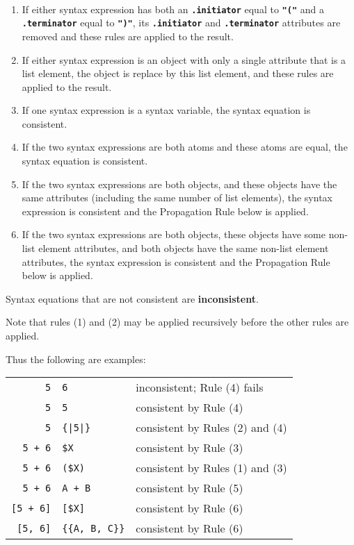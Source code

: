 \documentclass[12pt]{article}
\newcommand{\TT}[1]{{\tt \bfseries #1}}
\newcommand{\key}[1]{{\rm \bfseries #1}}
\newenvironment{indpar}[1][0.3in]%
	{\begin{list}{}%
		     {\setlength{\itemsep}{0in}%
		      \setlength{\topsep}{0in}%
		      \setlength{\parsep}{1ex}%
		      \setlength{\labelwidth}{#1}%
		      \setlength{\leftmargin}{#1}%
		      \addtolength{\leftmargin}{\labelsep}}%
	 \item}%
	{\end{list}}
\begin{document}
\begin{indpar}
\begin{list}{}{}
\item[\key{Syntax Equation Consistency Rules}%
	   \label{SYNTAX-EQUATION-CONSISTENCY-RULES}:]~

\begin{enumerate}
\item If either syntax expression has both an \TT{.initiator} equal to \TT{"("}
and a \TT{.ter\-min\-a\-tor} equal to \TT{")"}, its \TT{.initiator} and
\TT{.terminator} attributes are removed and these rules are applied to the
result.
\item If either syntax expression is an object with only a single attribute
that is a list element,
the object is replace by this list element,
and these rules are applied to the
result.
\item If one syntax expression is a syntax variable, the syntax equation
is consistent.
\item If the two syntax expressions are both atoms and these atoms are
equal, the syntax equation is consistent.
\item If the two syntax expressions are both objects, and these objects
have the same attributes (including the same number of list elements),
the syntax expression is consistent and the Propagation Rule
below is applied.
\item If the two syntax expressions are both objects, these objects
have some non-list element attributes, and both objects have the same
non-list element attributes,
the syntax expression is consistent and the Propagation Rule
below is applied.
\end{enumerate}

Syntax equations that are not consistent are \key{inconsistent}.

Note that rules (1) and (2) may be applied recursively
before the other rules are applied.
\end{list}
\end{indpar}

Thus the following are examples:

\begin{center}
\begin{tabular}{r@\TT{~:=:~}ll}
\verb/5/ & \verb/6/      & inconsistent; Rule (4) fails \\
\verb/5/ & \verb/5/      & consistent by Rule (4) \\
\verb/5/ & \verb/{|5|}/  & consistent by Rules (2) and (4) \\
\verb/5 + 6/ & \verb/$X/ & consistent by Rule (3) \\
\verb/5 + 6/ & \verb/($X)/ & consistent by Rules (1) and (3) \\
\verb/5 + 6/ & \verb/A + B/ & consistent by Rule (5) \\
\verb/[5 + 6]/ & \verb/[$X]/ & consistent by Rule (6) \\
\verb/[5, 6]/ & \verb/{{A, B, C}}/ & consistent by Rule (6) \\
\end{tabular}
\end{center}
\end{document}

